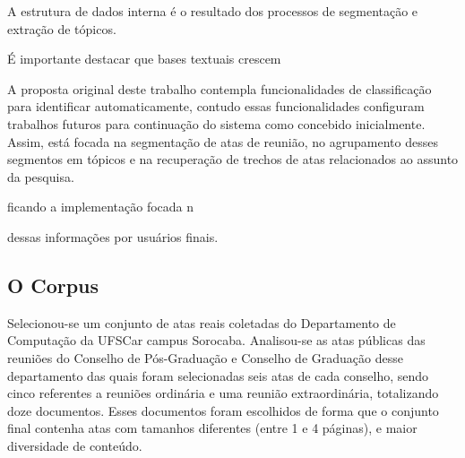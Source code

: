 A estrutura de dados interna é o resultado dos processos de segmentação e extração de tópicos.









É importante destacar que bases textuais crescem 



A proposta original deste trabalho contempla funcionalidades de classificação para identificar automaticamente, contudo essas funcionalidades configuram trabalhos futuros para continuação do sistema como concebido inicialmente. Assim, está focada na segmentação de atas de reunião, no agrupamento desses segmentos em tópicos e na recuperação de trechos de atas relacionados ao assunto da pesquisa.



ficando a implementação focada n

dessas informações por usuários finais.







\subsection{O Corpus}


Selecionou-se um conjunto de atas reais coletadas do Departamento de Computação da UFSCar campus Sorocaba. Analisou-se as atas públicas das reuniões do Conselho de Pós-Graduação e Conselho de Graduação desse departamento das quais foram selecionadas seis atas de cada conselho, sendo cinco referentes a reuniões ordinária e uma reunião extraordinária, totalizando doze documentos. Esses documentos foram escolhidos de forma que o conjunto final contenha atas com tamanhos diferentes (entre 1 e 4 páginas), e maior diversidade de conteúdo.






